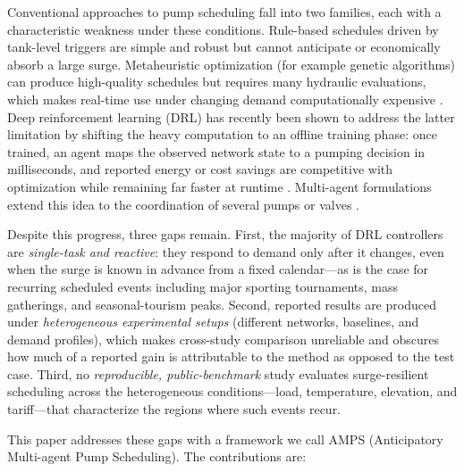 \documentclass[11pt,a4paper]{article}
\begin{document}
Conventional approaches to pump scheduling fall into two families, each with a
characteristic weakness under these conditions. Rule-based schedules driven by
tank-level triggers are simple and robust but cannot anticipate or economically
absorb a large surge. Metaheuristic optimization (for example genetic
algorithms) can produce high-quality schedules but requires many hydraulic
evaluations, which makes real-time use under changing demand computationally
expensive \citep{Hu2023EPPO}. Deep reinforcement learning (DRL) has recently been
shown to address the latter limitation by shifting the heavy computation to an
offline training phase: once trained, an agent maps the observed network state
to a pumping decision in milliseconds, and reported energy or cost savings are
competitive with optimization while remaining far faster at runtime
\citep{Hu2023EPPO,Pei2025RTPump}. Multi-agent formulations extend this idea to
the coordination of several pumps or valves \citep{Hu2023MARL}.

Despite this progress, three gaps remain. First, the majority of DRL controllers
are \emph{single-task and reactive}: they respond to demand only after it
changes, even when the surge is known in advance from a fixed calendar---as is
the case for recurring scheduled events including major sporting tournaments,
mass gatherings, and seasonal-tourism peaks. Second, reported results are
produced under \emph{heterogeneous experimental setups} (different networks,
baselines, and demand profiles), which makes cross-study comparison unreliable
and obscures how much of a reported gain is attributable to the method as
opposed to the test case. Third, no \emph{reproducible, public-benchmark} study
evaluates surge-resilient scheduling across the heterogeneous conditions---load,
temperature, elevation, and tariff---that characterize the regions where such
events recur.

This paper addresses these gaps with a framework we call AMPS (Anticipatory
Multi-agent Pump Scheduling). The contributions are:
\end{document}
